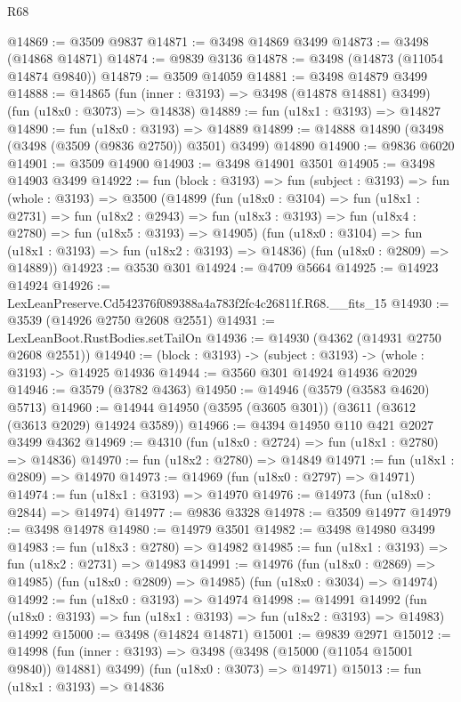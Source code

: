 \begin{lexlean}{R68}
\begin{coremodule}
@14869 := @3509 @9837
@14871 := @3498 @14869 @3499
@14873 := @3498 (@14868 @14871)
@14874 := @9839 @3136
@14878 := @3498 (@14873 (@11054 @14874 @9840))
@14879 := @3509 @14059
@14881 := @3498 @14879 @3499
@14888 := @14865
    (fun (inner : @3193) => @3498 (@14878 @14881) @3499)
    (fun (u18x0 : @3073) => @14838)
@14889 := fun (u18x1 : @3193) => @14827
@14890 := fun (u18x0 : @3193) => @14889
@14899 := @14888 @14890 (@3498 (@3498 (@3509 (@9836 @2750)) @3501) @3499) @14890
@14900 := @9836 @6020
@14901 := @3509 @14900
@14903 := @3498 @14901 @3501
@14905 := @3498 @14903 @3499
@14922 := fun (block : @3193) =>
  fun (subject : @3193) =>
  fun (whole : @3193) =>
  @3500
    (@14899
      (fun (u18x0 : @3104) =>
      fun (u18x1 : @2731) =>
      fun (u18x2 : @2943) =>
      fun (u18x3 : @3193) => fun (u18x4 : @2780) => fun (u18x5 : @3193) => @14905)
      (fun (u18x0 : @3104) => fun (u18x1 : @3193) => fun (u18x2 : @3193) => @14836)
      (fun (u18x0 : @2809) => @14889))
@14923 := @3530 @301
@14924 := @4709 @5664
@14925 := @14923 @14924
@14926 := LexLeanPreserve.Cd542376f089388a4a783f2fc4c26811f.R68.__fits_15
@14930 := @3539 (@14926 @2750 @2608 @2551)
@14931 := LexLeanBoot.RustBodies.setTailOn
@14936 := @14930 (@4362 (@14931 @2750 @2608 @2551))
@14940 := (block : @3193) -> (subject : @3193) -> (whole : @3193) -> @14925 @14936
@14944 := @3560 @301 @14924 @14936 @2029
@14946 := @3579 (@3782 @4363)
@14950 := @14946 (@3579 (@3583 @4620) @5713)
@14960 := @14944 @14950 (@3595 (@3605 @301)) (@3611 (@3612 (@3613 @2029) @14924 @3589))
@14966 := @4394 @14950 @110 @421 @2027 @3499 @4362
@14969 := @4310 (fun (u18x0 : @2724) => fun (u18x1 : @2780) => @14836)
@14970 := fun (u18x2 : @2780) => @14849
@14971 := fun (u18x1 : @2809) => @14970
@14973 := @14969 (fun (u18x0 : @2797) => @14971)
@14974 := fun (u18x1 : @3193) => @14970
@14976 := @14973 (fun (u18x0 : @2844) => @14974)
@14977 := @9836 @3328
@14978 := @3509 @14977
@14979 := @3498 @14978
@14980 := @14979 @3501
@14982 := @3498 @14980 @3499
@14983 := fun (u18x3 : @2780) => @14982
@14985 := fun (u18x1 : @3193) => fun (u18x2 : @2731) => @14983
@14991 := @14976
    (fun (u18x0 : @2869) => @14985)
    (fun (u18x0 : @2809) => @14985)
    (fun (u18x0 : @3034) => @14974)
@14992 := fun (u18x0 : @3193) => @14974
@14998 := @14991
    @14992
    (fun (u18x0 : @3193) => fun (u18x1 : @3193) => fun (u18x2 : @3193) => @14983)
    @14992
@15000 := @3498 (@14824 @14871)
@15001 := @9839 @2971
@15012 := @14998
    (fun (inner : @3193) => @3498 (@3498 (@15000 (@11054 @15001 @9840)) @14881) @3499)
    (fun (u18x0 : @3073) => @14971)
@15013 := fun (u18x1 : @3193) => @14836

\end{coremodule}
\end{lexlean}
